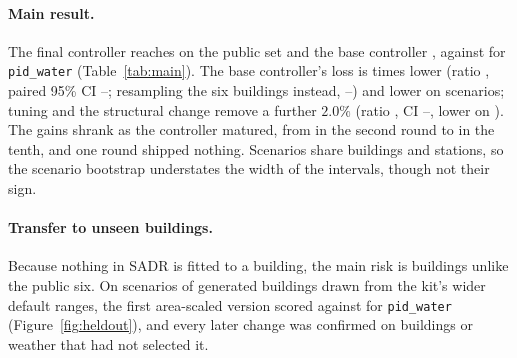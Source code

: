 \documentclass{article}
\begin{document}


\paragraph{Main result.} The final controller reaches \FinPub{} on the public set and the base controller \RTenConfPubCand, against \MetricPidWater{} for \texttt{pid\_water} (Table~\ref{tab:main}). The base controller's loss is \RElvPwTimes{} times lower (ratio \RElvPwRatio, paired 95\% CI \RElvPwRatioLo--\RElvPwRatioHi; resampling the six buildings instead, \RElvPwRatioCLo--\RElvPwRatioCHi) and lower on \RElvPwWins{} scenarios; tuning and the structural change remove a further \(2.0\%\) (ratio \FinPubRatio, CI \FinPubRatioLo--\FinPubRatioHi, lower on \FinPubWins). The gains shrank as the controller matured, from \CandWinnerRelRed{} in the second round to \RTenConfPubRelAbs{} in the tenth, and one round shipped nothing. Scenarios share buildings and stations, so the scenario bootstrap understates the width of the intervals, though not their sign.

\paragraph{Transfer to unseen buildings.} Because nothing in SADR is fitted to a building, the main risk is buildings unlike the public six. On \NHeldAll{} scenarios of \NHeldAllBuild{} generated buildings drawn from the kit's wider default ranges, the first area-scaled version scored \HeldAllMetricOurs{} against \HeldAllMetricPidWater{} for \texttt{pid\_water} (Figure~\ref{fig:heldout}), and every later change was confirmed on buildings or weather that had not selected it.
\end{document}
